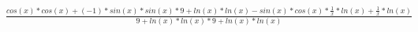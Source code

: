 \documentclass[12pt]{article}
\begin{document}
$\frac{cos(x)*cos(x)+(-1)*sin(x)*sin(x)*9+ln(x)*ln(x)-sin(x)*cos(x)*\frac{1}{x}*ln(x)+\frac{1}{x}*ln(x)}{9+ln(x)*ln(x)*9+ln(x)*ln(x)}$
\end{document}
